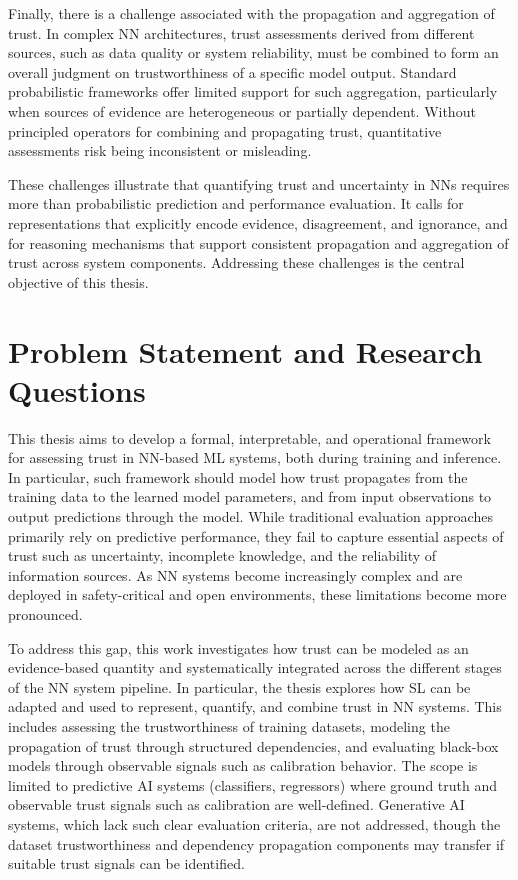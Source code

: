 Finally, there is a challenge associated with the propagation and aggregation of trust. In complex \ac{NN} architectures, trust assessments derived from different sources, such as data quality or system reliability, must be combined to form an overall judgment on trustworthiness of a specific model output. Standard probabilistic frameworks offer limited support for such aggregation, particularly when sources of evidence are heterogeneous or partially dependent. Without principled operators for combining and propagating trust, quantitative assessments risk being inconsistent or misleading.

These challenges illustrate that quantifying trust and uncertainty in \acp{NN} requires more than probabilistic prediction and performance evaluation. It calls for representations that explicitly encode evidence, disagreement, and ignorance, and for reasoning mechanisms that support consistent propagation and aggregation of trust across system components. Addressing these challenges is the central objective of this thesis.

\section{Problem Statement and Research Questions}

This thesis aims to develop a formal, interpretable, and operational framework for assessing trust in \ac{NN}-based \ac{ML} systems, both during training and inference. In particular, such framework should model how trust propagates from the training data to the learned model parameters, and from input observations to output predictions through the model. While traditional evaluation approaches primarily rely on predictive performance, they fail to capture essential aspects of trust such as uncertainty, incomplete knowledge, and the reliability of information sources. As \ac{NN} systems become increasingly complex and are deployed in safety-critical and open environments, these limitations become more pronounced.

To address this gap, this work investigates how trust can be modeled as an evidence-based quantity and systematically integrated across the different stages of the \ac{NN} system pipeline. In particular, the thesis explores how \ac{SL} can be adapted and used to represent, quantify, and combine trust in \ac{NN} systems. This includes assessing the trustworthiness of training datasets, modeling the propagation of trust through structured dependencies, and evaluating black-box models through observable signals such as calibration behavior. The scope is limited to predictive AI systems (classifiers, regressors) where ground truth and observable trust signals such as calibration are well-defined. Generative AI systems, which lack such clear evaluation criteria, are not addressed, though the dataset trustworthiness and dependency propagation components may transfer if suitable trust signals can be identified.

